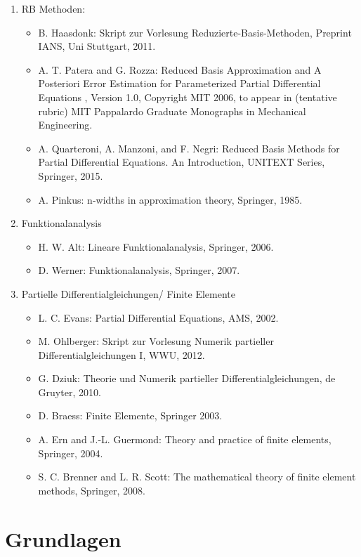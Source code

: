 \begin{enumerate}
\item RB Methoden:
\begin{itemize}
\item B. Haasdonk: Skript zur Vorlesung Reduzierte-Basis-Methoden, Preprint IANS, Uni Stuttgart, 2011.
\item A. T. Patera and G. Rozza: Reduced Basis Approximation and A Posteriori Error Estimation for Parameterized Partial Differential Equations , Version 1.0, Copyright MIT 2006, to appear in (tentative rubric) MIT Pappalardo Graduate Monographs in Mechanical Engineering.
\item A. Quarteroni, A. Manzoni, and F. Negri: Reduced Basis Methods for Partial Differential Equations. An Introduction, UNITEXT Series, Springer, 2015.
\item A. Pinkus: n-widths in approximation theory, Springer, 1985.
\end{itemize}
\item Funktionalanalysis
\begin{itemize}
\item H. W. Alt: Lineare Funktionalanalysis, Springer, 2006. 
\item D. Werner: Funktionalanalysis, Springer, 2007.
\end{itemize}
\item Partielle Differentialgleichungen/ Finite Elemente
\begin{itemize}
\item L. C. Evans: Partial Differential Equations, AMS, 2002.
\item M. Ohlberger: Skript zur Vorlesung Numerik partieller Differentialgleichungen I, WWU, 2012.
\item G. Dziuk: Theorie und Numerik partieller Differentialgleichungen, de Gruyter, 2010.
\item D. Braess: Finite Elemente, Springer 2003.
\item A. Ern and J.-L. Guermond: Theory and practice of finite elements, Springer, 2004.
\item S. C. Brenner and L. R. Scott: The mathematical theory of finite element methods, Springer, 2008.
\end{itemize}
\end{enumerate}

\section{Grundlagen}

